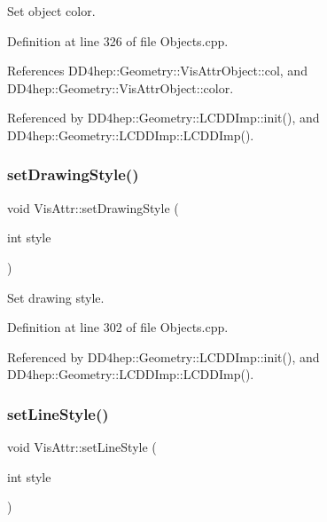 Set object color. 



Definition at line 326 of file Objects.\+cpp.



References D\+D4hep\+::\+Geometry\+::\+Vis\+Attr\+Object\+::col, and D\+D4hep\+::\+Geometry\+::\+Vis\+Attr\+Object\+::color.



Referenced by D\+D4hep\+::\+Geometry\+::\+L\+C\+D\+D\+Imp\+::init(), and D\+D4hep\+::\+Geometry\+::\+L\+C\+D\+D\+Imp\+::\+L\+C\+D\+D\+Imp().

\hypertarget{class_d_d4hep_1_1_geometry_1_1_vis_attr_a37d208476b8631402fe4777061abfc81}{}\label{class_d_d4hep_1_1_geometry_1_1_vis_attr_a37d208476b8631402fe4777061abfc81} 
\subsubsection{\texorpdfstring{set\+Drawing\+Style()}{setDrawingStyle()}}
{\footnotesize\ttfamily void Vis\+Attr\+::set\+Drawing\+Style (\begin{DoxyParamCaption}\item[{int}]{style }\end{DoxyParamCaption})}



Set drawing style. 



Definition at line 302 of file Objects.\+cpp.



Referenced by D\+D4hep\+::\+Geometry\+::\+L\+C\+D\+D\+Imp\+::init(), and D\+D4hep\+::\+Geometry\+::\+L\+C\+D\+D\+Imp\+::\+L\+C\+D\+D\+Imp().

\hypertarget{class_d_d4hep_1_1_geometry_1_1_vis_attr_ad86fa3158adc9cb58bdf7d72da8f1eee}{}\label{class_d_d4hep_1_1_geometry_1_1_vis_attr_ad86fa3158adc9cb58bdf7d72da8f1eee} 
\subsubsection{\texorpdfstring{set\+Line\+Style()}{setLineStyle()}}
{\footnotesize\ttfamily void Vis\+Attr\+::set\+Line\+Style (\begin{DoxyParamCaption}\item[{int}]{style }\end{DoxyParamCaption})}



